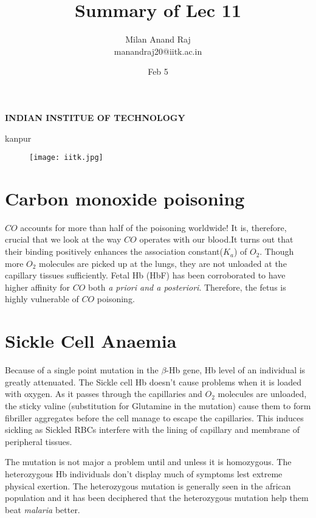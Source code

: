 \documentclass[12pt]{article}
\title{Summary of Lec 11}
\author{Milan Anand Raj\\manandraj20@iitk.ac.in}
\date{Feb 5}
\begin{document}
\NoBgThispage
\maketitle



\begin{center}
\textbf{INDIAN INSTITUE OF TECHNOLOGY}

kanpur
\end{center}


\vfill
\begin{figure}
\centering
\texttt{[image: iitk.jpg]}
\end{figure}
\clearpage
\tableofcontents
\clearpage
\NoBgThispage
\section{Carbon monoxide poisoning}
$CO$ accounts for more than half of the poisoning worldwide! It is, therefore, crucial that we look at the way $CO$ operates with our blood.It turns out that their binding positively enhances  the association constant($K_{a}$) of $O_{2}$. Though more $O_{2}$ molecules are picked up at the lungs, they are not unloaded at the capillary tissues sufficiently. Fetal Hb (HbF) has been corroborated to have higher affinity for $CO$ both \textit{a priori and a posteriori}. Therefore, the fetus is highly vulnerable of $CO$ poisoning.
\vfill
\section{Sickle Cell Anaemia}
Because of a single point mutation in the $\beta$-Hb gene, Hb level of an individual is greatly attenuated. The Sickle cell Hb doesn't cause problems when it is loaded with oxygen. As it passes through the capillaries and $O_{2}$ molecules are unloaded, the sticky valine (substitution for Glutamine in the mutation) cause them to form fibriller aggregates before the cell manage to escape the capillaries. This induces sickling as Sickled RBCs interfere with the lining of capillary and membrane of peripheral tissues.

The mutation is not major a problem until and unless it is homozygous. The heterozygous Hb individuals don't display much of symptoms lest extreme physical exertion. The heterozygous mutation is generally seen in the african population and it has been deciphered that the heterozygous mutation help them beat \textit{malaria} better.
\end{document}
